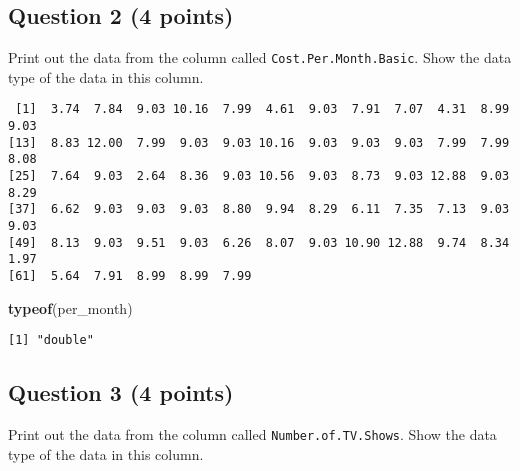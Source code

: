 \documentclass[
]{article}
\newenvironment{Shaded}{\begin{snugshade}}{\end{snugshade}}
\newcommand{\FunctionTok}[1]{\textcolor[rgb]{0.13,0.29,0.53}{\textbf{#1}}}
\newcommand{\NormalTok}[1]{#1}
\newcommand{\OtherTok}[1]{\textcolor[rgb]{0.56,0.35,0.01}{#1}}
\newcommand{\SpecialCharTok}[1]{\textcolor[rgb]{0.81,0.36,0.00}{\textbf{#1}}}
\begin{document}
\subsection{Question 2 (4 points)}\label{question-2-4-points}

Print out the data from the column called \texttt{Cost.Per.Month.Basic}.
Show the data type of the data in this column.

\begin{Shaded}
\end{Shaded}

\begin{verbatim}
 [1]  3.74  7.84  9.03 10.16  7.99  4.61  9.03  7.91  7.07  4.31  8.99  9.03
[13]  8.83 12.00  7.99  9.03  9.03 10.16  9.03  9.03  9.03  7.99  7.99  8.08
[25]  7.64  9.03  2.64  8.36  9.03 10.56  9.03  8.73  9.03 12.88  9.03  8.29
[37]  6.62  9.03  9.03  9.03  8.80  9.94  8.29  6.11  7.35  7.13  9.03  9.03
[49]  8.13  9.03  9.51  9.03  6.26  8.07  9.03 10.90 12.88  9.74  8.34  1.97
[61]  5.64  7.91  8.99  8.99  7.99
\end{verbatim}

\begin{Shaded}
\begin{Highlighting}[]
\FunctionTok{typeof}\NormalTok{(per\_month)}
\end{Highlighting}
\end{Shaded}

\begin{verbatim}
[1] "double"
\end{verbatim}

\subsection{Question 3 (4 points)}\label{question-3-4-points}

Print out the data from the column called \texttt{Number.of.TV.Shows}.
Show the data type of the data in this column.

\begin{Shaded}
\end{Shaded}
\end{document}
